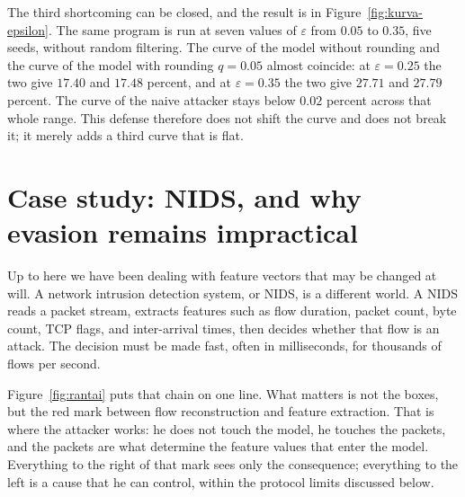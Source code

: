 The third shortcoming can be closed, and the result is in Figure~\ref{fig:kurva-epsilon}.
The same program is run at seven values of $\varepsilon$ from $0.05$ to
$0.35$, five seeds, without random filtering. The curve of the model without rounding and the curve
of the model with rounding $q=0.05$ almost coincide: at $\varepsilon=0.25$ the two
give $17.40$ and $17.48$ percent, and at $\varepsilon=0.35$ the two give
$27.71$ and $27.79$ percent. The curve of the naive attacker stays below $0.02$ percent
across that whole range. This defense therefore does not shift the curve and does not
break it; it merely adds a third curve that is flat.


\section{Case study: NIDS, and why evasion remains impractical}

Up to here we have been dealing with feature vectors that may be changed at will. A network
intrusion detection system, or NIDS, is a different world.
A NIDS reads a packet stream, extracts features such as flow duration,
packet count, byte count, TCP flags, and inter-arrival times, then decides
whether that flow is an attack. The decision must be made fast, often in milliseconds, for
thousands of flows per second.

Figure~\ref{fig:rantai} puts that chain on one line. What matters is not
the boxes, but the red mark between flow reconstruction and feature extraction.
That is where the attacker works: he does not touch the model, he touches the packets, and the
packets are what determine the feature values that enter the model. Everything to the right of that
mark sees only the consequence; everything to the left is a cause that he can control, within the
protocol limits discussed below.

